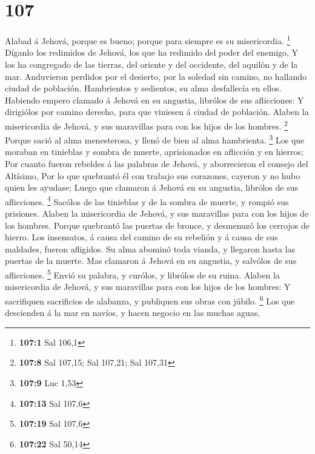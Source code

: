 \hypertarget{section-106}{%
\section{107}\label{section-106}}

 Alabad á Jehová, porque es bueno; porque para siempre es su
misericordia. \footnote{\textbf{107:1} Sal 106,1}  Díganlo
los redimidos de Jehová, los que ha redimido del poder del enemigo,
 Y los ha congregado de las tierras, del oriente y del
occidente, del aquilón y de la mar.  Anduvieron perdidos por
el desierto, por la soledad sin camino, no hallando ciudad de población.
 Hambrientos y sedientos, su alma desfallecía en ellos.
 Habiendo empero clamado á Jehová en su angustia, librólos
de sus aflicciones:  Y dirigiólos por camino derecho, para
que viniesen á ciudad de población.  Alaben la misericordia
de Jehová, y sus maravillas para con los hijos de los hombres.
\footnote{\textbf{107:8} Sal 107,15; Sal 107,21; Sal 107,31}
 Porque sació al alma menesterosa, y llenó de bien al alma
hambrienta. \footnote{\textbf{107:9} Luc 1,53}  Los que
moraban en tinieblas y sombra de muerte, aprisionados en aflicción y en
hierros;  Por cuanto fueron rebeldes á las palabras de
Jehová, y aborrecieron el consejo del Altísimo,  Por lo que
quebrantó él con trabajo sus corazones, cayeron y no hubo quien les
ayudase;  Luego que clamaron á Jehová en su angustia,
librólos de sus aflicciones. \footnote{\textbf{107:13} Sal 107,6}
 Sacólos de las tinieblas y de la sombra de muerte, y
rompió sus prisiones.  Alaben la misericordia de Jehová, y
sus maravillas para con los hijos de los hombres.  Porque
quebrantó las puertas de bronce, y desmenuzó los cerrojos de hierro.
 Los insensatos, á causa del camino de su rebelión y á
causa de sus maldades, fueron afligidos.  Su alma abominó
toda vianda, y llegaron hasta las puertas de la muerte. 
Mas clamaron á Jehová en su angustia, y salvólos de sus aflicciones.
\footnote{\textbf{107:19} Sal 107,6}  Envió su palabra, y
curólos, y librólos de su ruina.  Alaben la misericordia de
Jehová, y sus maravillas para con los hijos de los hombres:
 Y sacrifiquen sacrificios de alabanza, y publiquen sus
obras con júbilo. \footnote{\textbf{107:22} Sal 50,14}  Los
que descienden á la mar en navíos, y hacen negocio en las muchas aguas,
